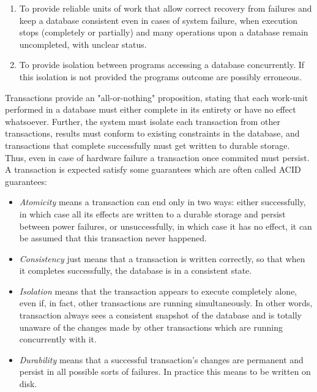 \documentclass[11pt,a4paper]{article}
\begin{document}
\begin{enumerate}
\item To provide reliable units of work that allow correct recovery from failures and keep a database consistent even in cases of system failure, when execution stops (completely or partially) and many operations upon a database remain uncompleted, with unclear status.
\item To provide isolation between programs accessing a database concurrently. If this isolation is not provided the programs outcome are possibly erroneous.
\end{enumerate}

Transactions provide an "all-or-nothing" proposition, stating that each work-unit performed in a database must either complete in its entirety or have no effect whatsoever. Further, the system must isolate each transaction from other transactions, results must conform to existing constraints in the database, and transactions that complete successfully must get written to durable storage. Thus, even in case of hardware failure a transaction once commited must persist. A transaction is expected satisfy some guarantees which are often called ACID guarantees: 

\begin{itemize}
\item \emph{Atomicity} means a transaction can end only in two ways: either successfully, in which case all its effects are written to a durable storage and persist between power failures, or unsuccessfully, in which case it has no effect, it can be assumed that this transaction never happened. 
\item \emph{Consistency} just means that a transaction is written correctly, so that when it completes successfully, the database is in a consistent state.
\item \emph{Isolation} means that the transaction appears to execute completely alone, even if, in fact, other transactions are running simultaneously. In other words, transaction always sees a consistent snapshot of the database and is totally unaware of the changes made by other transactions which are running concurrently with it. 
\item \emph{Durability} means that a successful transaction's changes are permanent and persist in all possible sorts of failures. In practice this means to be written on disk. 
\end{itemize}
\end{document}
